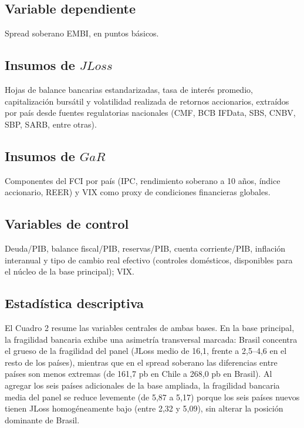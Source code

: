 \documentclass[5p,times,twocolumn,authoryear]{elsarticle}
\begin{document}
\subsection{Variable dependiente}
Spread soberano EMBI, en puntos básicos.

\subsection{Insumos de $JLoss$}
Hojas de balance bancarias estandarizadas, tasa de interés promedio, capitalización bursátil y volatilidad realizada de retornos accionarios, extraídos por país desde fuentes regulatorias nacionales (CMF, BCB IFData, SBS, CNBV, SBP, SARB, entre otras).

\subsection{Insumos de $GaR$}
Componentes del FCI por país (IPC, rendimiento soberano a 10 años, índice accionario, REER) y VIX como proxy de condiciones financieras globales.

\subsection{Variables de control}
Deuda/PIB, balance fiscal/PIB, reservas/PIB, cuenta corriente/PIB, inflación interanual y tipo de cambio real efectivo (controles domésticos, disponibles para el núcleo de la base principal); VIX.

\subsection{Estadística descriptiva}

El Cuadro 2 resume las variables centrales de ambas bases. En la base principal, la fragilidad bancaria exhibe una asimetría transversal marcada: Brasil concentra el grueso de la fragilidad del panel (JLoss medio de 16,1, frente a 2,5–4,6 en el resto de los países), mientras que en el spread soberano las diferencias entre países son menos extremas (de 161,7 pb en Chile a 268,0 pb en Brasil). Al agregar los seis países adicionales de la base ampliada, la fragilidad bancaria media del panel se reduce levemente (de 5,87 a 5,17) porque los seis países nuevos tienen JLoss homogéneamente bajo (entre 2,32 y 5,09), sin alterar la posición dominante de Brasil.
\end{document}

